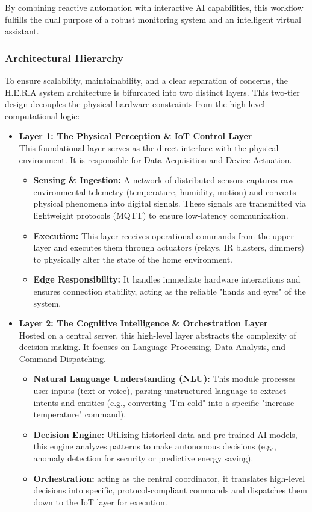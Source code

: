 By combining reactive automation with interactive AI capabilities, this workflow fulfills the dual purpose of a robust monitoring system and an intelligent virtual assistant.

\subsubsection*{Architectural Hierarchy}
To ensure scalability, maintainability, and a clear separation of concerns, the H.E.R.A system architecture is bifurcated into two distinct layers. This two-tier design decouples the physical hardware constraints from the high-level computational logic:

\begin{itemize}
    \item \textbf{Layer 1: The Physical Perception \& IoT Control Layer} \\
    This foundational layer serves as the direct interface with the physical environment. It is responsible for Data Acquisition and Device Actuation.
    \begin{itemize}
        \item \textbf{Sensing \& Ingestion:} A network of distributed sensors captures raw environmental telemetry (temperature, humidity, motion) and converts physical phenomena into digital signals. These signals are transmitted via lightweight protocols (MQTT) to ensure low-latency communication.
        \item \textbf{Execution:} This layer receives operational commands from the upper layer and executes them through actuators (relays, IR blasters, dimmers) to physically alter the state of the home environment.
        \item \textbf{Edge Responsibility:} It handles immediate hardware interactions and ensures connection stability, acting as the reliable "hands and eyes" of the system.
    \end{itemize}

    \item \textbf{Layer 2: The Cognitive Intelligence \& Orchestration Layer} \\
    Hosted on a central server, this high-level layer abstracts the complexity of decision-making. It focuses on Language Processing, Data Analysis, and Command Dispatching.
    \begin{itemize}
        \item \textbf{Natural Language Understanding (NLU):} This module processes user inputs (text or voice), parsing unstructured language to extract intents and entities (e.g., converting "I'm cold" into a specific "increase temperature" command).
        \item \textbf{Decision Engine:} Utilizing historical data and pre-trained AI models, this engine analyzes patterns to make autonomous decisions (e.g., anomaly detection for security or predictive energy saving).
        \item \textbf{Orchestration:} acting as the central coordinator, it translates high-level decisions into specific, protocol-compliant commands and dispatches them down to the IoT layer for execution.
    \end{itemize}
\end{itemize}

